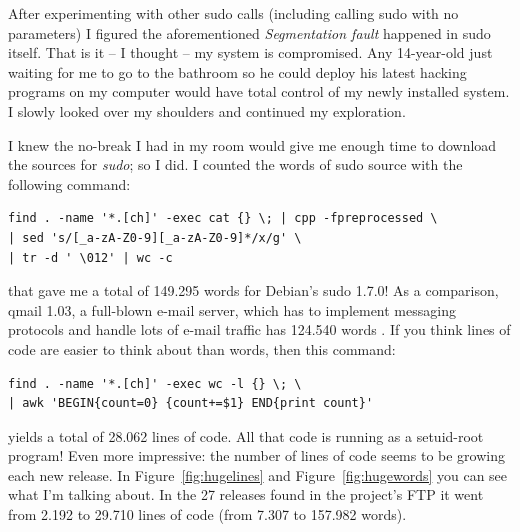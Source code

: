 \documentclass{article}
\begin{document}
After experimenting with other sudo calls (including calling sudo with no
parameters) I figured the aforementioned \emph{Segmentation fault} happened in
sudo itself. That is it -- I thought -- my system is compromised. Any
14-year-old just waiting for me to go to the bathroom so he could deploy his
latest hacking programs on my computer would have total control of my newly
installed system. I slowly looked over my shoulders and continued my
exploration.

I knew the no-break I had in my room would give me enough time to download the
sources for \emph{sudo}; so I did. I counted the words of sudo source with
the following command:
\begin{verbatim}
find . -name '*.[ch]' -exec cat {} \; | cpp -fpreprocessed \
| sed 's/[_a-zA-Z0-9][_a-zA-Z0-9]*/x/g' \
| tr -d ' \012' | wc -c
\end{verbatim}
that gave me a total of 149.295 words for Debian's sudo 1.7.0! As a comparison,
qmail 1.03, a full-blown e-mail server, which has to implement messaging
protocols and handle lots of e-mail traffic has 124.540 words \cite{djb}.
If you think lines of code are easier to think about than words, then this
command:
\begin{verbatim}
find . -name '*.[ch]' -exec wc -l {} \; \
| awk 'BEGIN{count=0} {count+=$1} END{print count}'
\end{verbatim}
yields a total of 28.062 lines of code. All that code is running as a setuid-root
program! Even more impressive: the number of lines of code seems to be growing
each new release. In Figure~\ref{fig:hugelines} and Figure~\ref{fig:hugewords}
you can see what I'm talking about. In the 27 releases found in the project's
FTP \cite{sudoFTP} it went from 2.192 to 29.710 lines of code (from 7.307 to
157.982 words).
\end{document}
